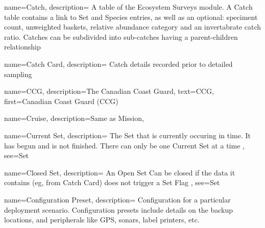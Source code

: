  {
    name=Catch,
    description={
        A table of the Ecosystem Surveys module. A Catch table contains a link to \gls{Set} and \gls{Species} entries, as well as an optional: speciment count, unweighted baskets, relative abundance category and an invertabrate catch ratio. Catches can be subdivided into sub-catches having a parent-children relationship}
}

 {
    name=Catch Card,
    description={
        Catch details recorded prior to detailed sampling}
}

 {
    name=CCG,
    description={The Canadian Coast Guard},
    text={CCG},
    first={Canadian Coast Guard (CCG)}
}

 {
    name=Cruise,
    description={Same as \gls{Mission}},
}

 {
    name=Current Set,
    description={
        The \gls{Set} that is currently occuring in time.
        It has begun and is not finished.
        There can only be one \gls{Current Set} at a time
    },
    see={Set}
}

 {
    name=Closed Set,
    description={
        An \gls{Open Set} Can be closed if the data it contains (eg, from \gls{Catch Card}) does not trigger a \gls{Set Flag}
    },
    see={Set}
}

 {
    name=Configuration Preset,
    description={
        Configuration for a particular deployment scenario. Configuration presets include details on the backup locations, and peripherals like GPS, sonars, label printers, etc.
    }
}





